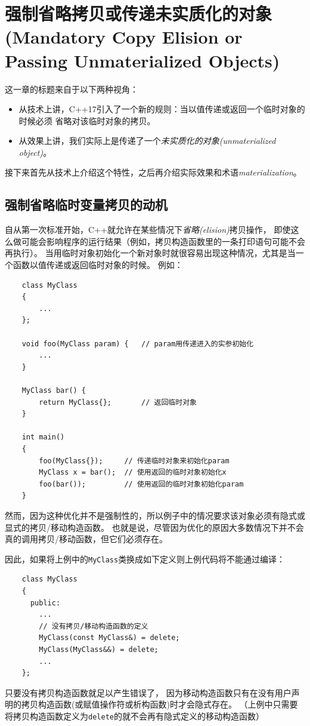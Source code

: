 \chapter[强制省略拷贝或传递未实质化的对象]{强制省略拷贝或传递未实质化的对象
(Mandatory Copy Elision or Passing Unmaterialized Objects)}\label{ch5}
这一章的标题来自于以下两种视角：
\begin{itemize}
    \item 从技术上讲，C++17引入了一个新的规则：当以值传递或返回一个临时对象的时候必须
    省略对该临时对象的拷贝。
    \item 从效果上讲，我们实际上是传递了一个\emph{未实质化的对象(unmaterialized object)}。
\end{itemize}
接下来首先从技术上介绍这个特性，之后再介绍实际效果和术语\emph{materialization}。


\section{强制省略临时变量拷贝的动机}
自从第一次标准开始，C++就允许在某些情况下\emph{省略(elision)}拷贝操作，
即使这么做可能会影响程序的运行结果（例如，拷贝构造函数里的一条打印语句可能不会再执行）。
当用临时对象初始化一个新对象时就很容易出现这种情况，尤其是当一个函数以值传递或返回临时对象的时候。
例如：
\begin{lstlisting}
    class MyClass
    {
        ...
    };

    void foo(MyClass param) {   // param用传递进入的实参初始化
        ...
    }

    MyClass bar() {
        return MyClass{};       // 返回临时对象
    }

    int main()
    {
        foo(MyClass{});     // 传递临时对象来初始化param
        MyClass x = bar();  // 使用返回的临时对象初始化x
        foo(bar());         // 使用返回的临时对象初始化param
    }
\end{lstlisting}
然而，因为这种优化并不是强制性的，所以例子中的情况要求该对象必须有隐式或显式的拷贝/移动构造函数。
也就是说，尽管因为优化的原因大多数情况下并不会真的调用拷贝/移动函数，但它们必须存在。

因此，如果将上例中的\texttt{MyClass}类换成如下定义则上例代码将不能通过编译：
\begin{lstlisting}
    class MyClass
    {
      public:
        ...
        // 没有拷贝/移动构造函数的定义
        MyClass(const MyClass&) = delete;
        MyClass(MyClass&&) = delete;
        ...
    };
\end{lstlisting}
只要没有拷贝构造函数就足以产生错误了，
因为移动构造函数只有在没有用户声明的拷贝构造函数(或赋值操作符或析构函数)时才会隐式存在。
（上例中只需要将拷贝构造函数定义为\texttt{delete}的就不会再有隐式定义的移动构造函数）

